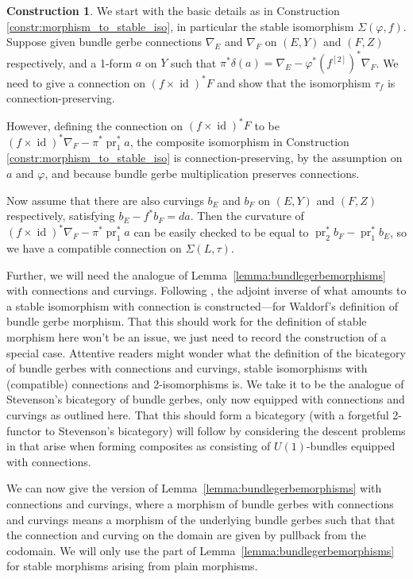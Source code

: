 \documentclass[12pt]{amsart}
\DeclareMathOperator{\id}{id}
\DeclareMathOperator{\pr}{pr}
\theoremstyle{plain}
\theoremstyle{definition}
\newtheorem{construction}[theorem]{Construction}
\theoremstyle{remark}
\numberwithin{equation}{section}
\newcommand{\<}{\langle}
\renewcommand{\>}{\rangle}
\begin{document}
\begin{construction}\label{constr:morphism_to_stable_iso_w_conn_curv}
We start with the basic details as in Construction \ref{constr:morphism_to_stable_iso}, in particular the stable isomorphism $\Sigma(\varphi,f)$.
Suppose given bundle gerbe connections $\nabla_E$ and $\nabla_F$ on $(E,Y)$ and $(F,Z)$ respectively, and a 1-form $a$ on $Y$ such that $\pi^*\delta(a) = \nabla_E - \varphi^*(f^{[2]})^*\nabla_F$.
We need to give a connection on $(f\times\id)^*F$ and show that the isomorphism $\tau_f$ is connection-preserving.

However, defining the connection on $(f\times\id)^*F$ to be $(f\times\id)^*\nabla_F - \pi^* \pr_1^* a$, the composite isomorphism in Construction \ref{constr:morphism_to_stable_iso} is connection-preserving, by the assumption on $a$ and $\varphi$, and because bundle gerbe multiplication preserves connections.

Now assume that there are also curvings $b_E$ and $b_F$ on $(E,Y)$ and $(F,Z)$ respectively, satisfying $b_E - f^*b_F = da$.
Then the curvature of $(f\times\id)^*\nabla_F - \pi^* \pr_1^* a$ can be easily checked to be equal to $\pr_2^*b_F - \pr_1^*b_E$, so we have a compatible connection on $\Sigma(L,\tau)$.
\end{construction}


Further, we will need the analogue of Lemma~\ref{lemma:bundlegerbemorphisms} with connections and curvings.
Following \cite[Proposition 1.13]{Waldorf_07}, the adjoint inverse of what amounts to a stable isomorphism with connection is constructed---for Waldorf's definition of bundle gerbe morphism. 
That this should work for the definition of stable morphism here won't be an issue, we just need to record the construction of a special case.
Attentive readers might wonder what the definition of the bicategory of bundle gerbes with connections and curvings, stable isomorphisms with (compatible) connections and 2-isomorphisms is. We take it to be the analogue of Stevenson's bicategory of bundle gerbes, only now equipped with connections and curvings as outlined here. 
That this should form a bicategory (with a forgetful 2-functor to Stevenson's bicategory) will follow by considering the descent problems in \cite[Chapter 3]{StevPhD} that arise when forming composites as consisting of $U(1)$-bundles equipped with connections.

We can now give the version of Lemma~\ref{lemma:bundlegerbemorphisms} with connections and curvings, where a morphism of bundle gerbes with connections and curvings means a morphism of the underlying bundle gerbes such that that the connection and curving on the domain are given by pullback from the codomain. We will only use the part of Lemma~\ref{lemma:bundlegerbemorphisms} for stable morphisms arising from plain morphisms.
\end{document}

